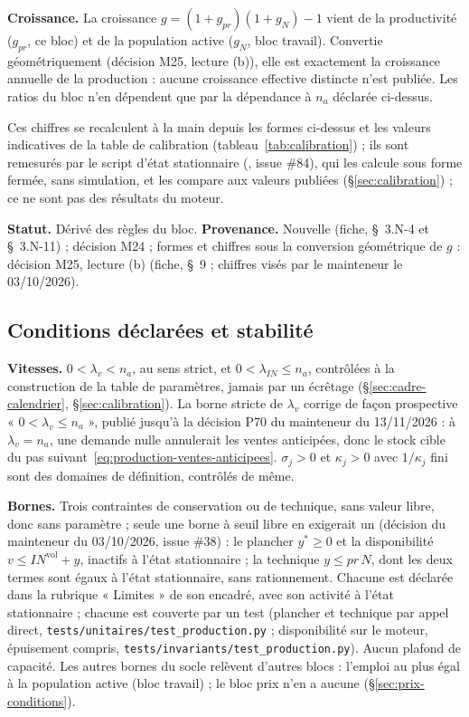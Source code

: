 \documentclass[11pt,a4paper]{article}
\newcommand{\code}[1]{\texttt{\detokenize{#1}}}
\begin{document}
\textbf{Croissance.} La croissance $g = (1 + g_{\mathit{pr}})(1 + g_N) - 1$ vient de la productivité ($g_{\mathit{pr}}$, ce bloc) et de la population active ($g_N$, bloc travail). Convertie géométriquement (décision M25, lecture (b)), elle est exactement la croissance annuelle de la production : aucune croissance effective distincte n'est publiée. Les ratios du bloc n'en dépendent que par la dépendance à $n_a$ déclarée ci-dessus.

{\setlength{\emergencystretch}{3em}Ces chiffres se recalculent à la main depuis les formes ci-dessus et les valeurs indicatives de la table de calibration (tableau~\ref{tab:calibration}) ; ils sont remesurés par le script d'état stationnaire (\code{outils/etat_stationnaire.py}, issue \#84), qui les calcule sous forme fermée, sans simulation, et les compare aux valeurs publiées (\S\ref{sec:calibration}) ; ce ne sont pas des résultats du moteur.\par}

\textbf{Statut.} Dérivé des règles du bloc. \textbf{Provenance.} Nouvelle (fiche, \S~3.N-4 et \S~3.N-11) ; décision M24 ; formes et chiffres sous la conversion géométrique de $g$ : décision M25, lecture (b) (fiche, \S~9 ; chiffres visés par le mainteneur le 03/10/2026).

\subsection{Conditions déclarées et stabilité}
\label{sec:production-conditions}
\textbf{Vitesses.} $0 < \lambda_v < n_a$, au sens strict, et $0 < \lambda_{\mathit{IN}} \le n_a$, contrôlées à la construction de la table de paramètres, jamais par un écrêtage (\S\ref{sec:cadre-calendrier}, \S\ref{sec:calibration}). La borne stricte de $\lambda_v$ corrige de façon prospective « $0 < \lambda_v \le n_a$ », publié jusqu'à la décision P70 du mainteneur du 13/11/2026 : à $\lambda_v = n_a$, une demande nulle annulerait les ventes anticipées, donc le stock cible du pas suivant~\eqref{eq:production-ventes-anticipees}. $\sigma_j > 0$ et $\kappa_j > 0$ avec $1/\kappa_j$ fini sont des domaines de définition, contrôlés de même.

\textbf{Bornes.} Trois contraintes de conservation ou de technique, sans valeur libre, donc sans paramètre ; seule une borne à seuil libre en exigerait un (décision du mainteneur du 03/10/2026, issue \#38) : le plancher $y^{\ast} \ge 0$ et la disponibilité $v \le \mathit{IN}^{\mathrm{vol}} + y$, inactifs à l'état stationnaire ; la technique $y \le \mathit{pr}\,N$, dont les deux termes sont égaux à l'état stationnaire, sans rationnement. Chacune est déclarée dans la rubrique « Limites » de son encadré, avec son activité à l'état stationnaire ; chacune est couverte par un test (plancher et technique par appel direct, \nolinkurl{tests/unitaires/test_production.py} ; disponibilité sur le moteur, épuisement compris, \nolinkurl{tests/invariants/test_production.py}). Aucun plafond de capacité. Les autres bornes du socle relèvent d'autres blocs : l'emploi au plus égal à la population active (bloc travail) ; le bloc prix n'en a aucune (\S\ref{sec:prix-conditions}).
\end{document}
